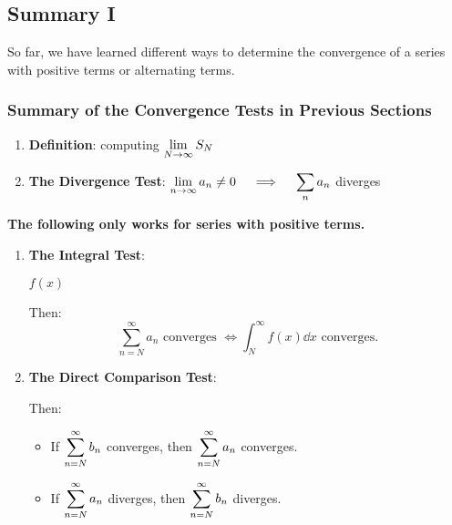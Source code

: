 \newpage
\subsection{Summary I} 
So far, we have learned different ways to determine the convergence of a series with positive terms or alternating terms.

\subsubsection{Summary of the Convergence Tests in Previous Sections}

\begin{center}
\begin{tcolorbox}
\begin{enumerate}
    \item \textbf{Definition}: computing $\displaystyle\lim_{N \to \infty} S_N$
    
    \item \textbf{The Divergence Test}: $\displaystyle\lim_{n \to \infty} a_n \neq 0 \quad \implies \quad \sum_n a_n$ diverges
\end{enumerate}

\textbf{The following only works for series with positive terms.}
\begin{enumerate}[resume]
    \item \textbf{The Integral Test}: 
    
    $f(x)$  Then:
    \[\sum_{n=N}^\infty a_n \text{ converges } \iff \int_N^\infty f(x) \dd x \text{ converges.}\]
    
    \item \textbf{The Direct Comparison Test}: 
    Then:
    \begin{itemize}
        \item If $\displaystyle\sum_{n=N}^\infty b_n$ converges, then $\displaystyle\sum_{n=N}^\infty a_n$ converges.
        \item If $\displaystyle\sum_{n=N}^\infty a_n$ diverges, then $\displaystyle\sum_{n=N}^\infty b_n$ diverges.
    \end{itemize}
    

\end{enumerate}
\end{tcolorbox}
\end{center}
